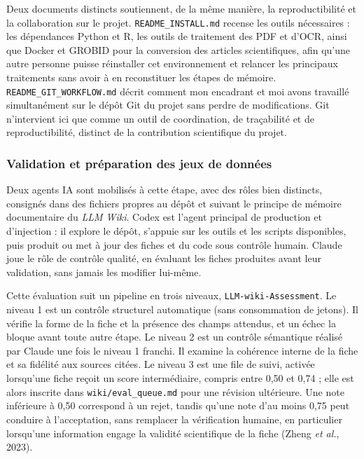 \documentclass[11pt,a4paper]{article}
\begin{document}
Deux documents distincts soutiennent, de la même manière, la reproductibilité et la collaboration sur le projet. \texttt{README\_INSTALL.md} recense les outils nécessaires : les dépendances Python et R, les outils de traitement des PDF et d'OCR, ainsi que Docker et GROBID pour la conversion des articles scientifiques, afin qu'une autre personne puisse réinstaller cet environnement et relancer les principaux traitements sans avoir à en reconstituer les étapes de mémoire. \texttt{README\_GIT\_WORKFLOW.md} décrit comment mon encadrant et moi avons travaillé simultanément sur le dépôt Git du projet sans perdre de modifications. Git n'intervient ici que comme un outil de coordination, de traçabilité et de reproductibilité, distinct de la contribution scientifique du projet.

\subsubsection{Validation et préparation des jeux de données}


Deux agents IA sont mobilisés à cette étape, avec des rôles bien distincts, consignés dans des fichiers propres au dépôt et suivant le principe de mémoire documentaire du \textit{LLM Wiki}. Codex est l'agent principal de production et d'injection : il explore le dépôt, s'appuie sur les outils et les scripts disponibles, puis produit ou met à jour des fiches et du code sous contrôle humain. Claude joue le rôle de contrôle qualité, en évaluant les fiches produites avant leur validation, sans jamais les modifier lui-même.

Cette évaluation suit un pipeline en trois niveaux, \texttt{LLM-wiki-Assessment}. Le niveau 1 est un contrôle structurel automatique (sans consommation de jetons). Il vérifie la forme de la fiche et la présence des champs attendus, et un échec la bloque avant toute autre étape. Le niveau 2 est un contrôle sémantique réalisé par Claude une fois le niveau 1 franchi. Il examine la cohérence interne de la fiche et sa fidélité aux sources citées. Le niveau 3 est une file de suivi, activée lorsqu'une fiche reçoit un score intermédiaire, compris entre 0,50 et 0,74 ; elle est alors inscrite dans \texttt{wiki/eval\_queue.md} pour une révision ultérieure. Une note inférieure à 0,50 correspond à un rejet, tandis qu'une note d'au moins 0,75 peut conduire à l'acceptation, sans remplacer la vérification humaine, en particulier lorsqu'une information engage la validité scientifique de la fiche (Zheng \textit{et al.}, 2023).
\end{document}
